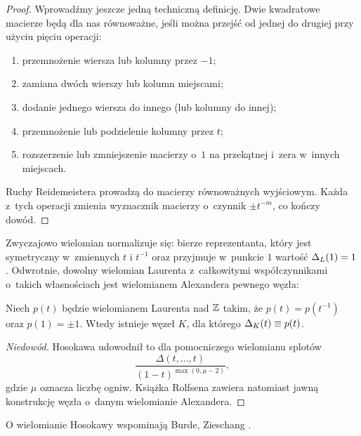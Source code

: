\begin{proof}
    Wprowadźmy jeszcze jedną techniczną definicję.
    Dwie kwadratowe macierze będą dla nas równoważne, jeśli można przejść od jednej do drugiej przy użyciu pięciu operacji:
    \begin{enumerate}
        \item przemnożenie wiersza lub kolumny przez $-1$;
        \item zamiana dwóch wierszy lub kolumn miejscami;
        \item dodanie jednego wiersza do innego (lub kolumny do innej);
        \item przemnożenie lub podzielenie kolumny przez $t$;
        \item rozszerzenie lub zmniejszenie macierzy o~$1$ na przekątnej i~zera w~innych miejscach.
    \end{enumerate}

    Ruchy Reidemeistera prowadzą do macierzy równoważnych wyjściowym.
    Każda z~tych operacji zmienia wyznacznik macierzy o~czynnik $\pm t^{-m}$, co kończy dowód.
\end{proof}

Zwyczajowo wielomian normalizuje się: bierze reprezentanta, który jest symetryczny w~zmiennych $t$ i $t^{-1}$ oraz przyjmuje w~punkcie $1$ wartość $\Delta_L(1) = 1$.
Odwrotnie, dowolny wielomian Laurenta z~całkowitymi współczynnikami o~takich własnościach jest wielomianem Alexandera pewnego węzła:

\begin{proposition}
\label{prp:alexander_hosokawa}%
    Niech $p(t)$ będzie wielomianem Laurenta nad $\mathbb Z$ takim, że $p(t) = p(t^{-1})$ oraz $p(1) = \pm 1$.
    Wtedy istnieje węzeł $K$, dla którego $\Delta_K(t) \equiv p(t)$.
\end{proposition}

\begin{proof}[Niedowód]
%
    Hosokawa \cite{hosokawa1958} udowodnił to dla pomocniczego wielomianu splotów
    \begin{equation}
        \frac{\Delta(t, \ldots, t)}{(1-t)^{\max(0, \mu - 2)}},
    \end{equation}
    gdzie $\mu$ oznacza liczbę ogniw.
    Książka Rolfsena \cite[s. 171-172]{rolfsen1976} zawiera natomiast jawną konstrukcję węzła o~danym wielomianie Alexandera.
\end{proof}

O wielomianie Hosokawy wspominają Burde, Zieschang \cite[s. 151, 183]{burde2014}.


